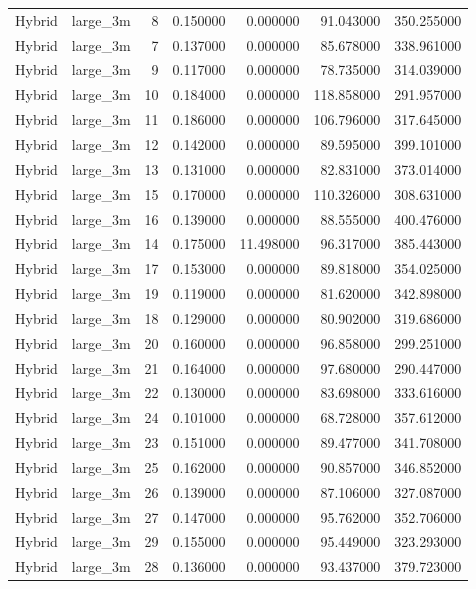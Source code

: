 \begin{tabular}{llrrrrr}
Hybrid & large_3m & 8 & 0.150000 & 0.000000 & 91.043000 & 350.255000 \\
Hybrid & large_3m & 7 & 0.137000 & 0.000000 & 85.678000 & 338.961000 \\
Hybrid & large_3m & 9 & 0.117000 & 0.000000 & 78.735000 & 314.039000 \\
Hybrid & large_3m & 10 & 0.184000 & 0.000000 & 118.858000 & 291.957000 \\
Hybrid & large_3m & 11 & 0.186000 & 0.000000 & 106.796000 & 317.645000 \\
Hybrid & large_3m & 12 & 0.142000 & 0.000000 & 89.595000 & 399.101000 \\
Hybrid & large_3m & 13 & 0.131000 & 0.000000 & 82.831000 & 373.014000 \\
Hybrid & large_3m & 15 & 0.170000 & 0.000000 & 110.326000 & 308.631000 \\
Hybrid & large_3m & 16 & 0.139000 & 0.000000 & 88.555000 & 400.476000 \\
Hybrid & large_3m & 14 & 0.175000 & 11.498000 & 96.317000 & 385.443000 \\
Hybrid & large_3m & 17 & 0.153000 & 0.000000 & 89.818000 & 354.025000 \\
Hybrid & large_3m & 19 & 0.119000 & 0.000000 & 81.620000 & 342.898000 \\
Hybrid & large_3m & 18 & 0.129000 & 0.000000 & 80.902000 & 319.686000 \\
Hybrid & large_3m & 20 & 0.160000 & 0.000000 & 96.858000 & 299.251000 \\
Hybrid & large_3m & 21 & 0.164000 & 0.000000 & 97.680000 & 290.447000 \\
Hybrid & large_3m & 22 & 0.130000 & 0.000000 & 83.698000 & 333.616000 \\
Hybrid & large_3m & 24 & 0.101000 & 0.000000 & 68.728000 & 357.612000 \\
Hybrid & large_3m & 23 & 0.151000 & 0.000000 & 89.477000 & 341.708000 \\
Hybrid & large_3m & 25 & 0.162000 & 0.000000 & 90.857000 & 346.852000 \\
Hybrid & large_3m & 26 & 0.139000 & 0.000000 & 87.106000 & 327.087000 \\
Hybrid & large_3m & 27 & 0.147000 & 0.000000 & 95.762000 & 352.706000 \\
Hybrid & large_3m & 29 & 0.155000 & 0.000000 & 95.449000 & 323.293000 \\
Hybrid & large_3m & 28 & 0.136000 & 0.000000 & 93.437000 & 379.723000 \\

\end{tabular}
